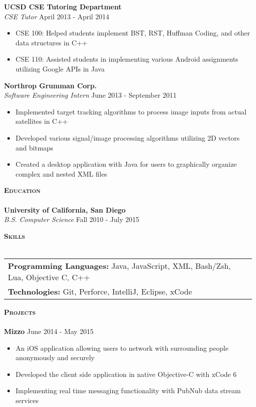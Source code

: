 \documentclass{article}
\newcommand{\lineunder} {
    \vspace*{-8pt} \\
    \hspace*{-18pt} \hrulefill \\
}
\newcommand{\header} [1] {
    {\hspace*{-18pt}\vspace*{6pt} \large{\textbf{\textsc{#1}}}}
    \vspace*{-6pt} \lineunder
}
\begin{document}
\textbf{UCSD CSE Tutoring Department} \hfill \\
\textit{CSE Tutor} \hfill April 2013 - April 2014
\vspace{-1mm}
\begin{itemize} \itemsep -1pt
	\item CSE 100: Helped students implement BST, RST, Huffman Coding, and other data structures in C++
	\item CSE 110: Assisted students in implementing various Android assignments utilizing Google APIs in Java
\end{itemize}

\textbf{Northrop Grumman Corp.} \\
\textit{Software Engineering Intern} \hfill June 2013 - September 2011
\vspace{-1mm}
\begin{itemize} \itemsep -1pt
	\item Implemented target tracking algorithms to process image inputs from actual satellites in C++
	\item Developed various signal/image processing algorithms utilizing 2D vectors and bitmaps
	\item Created a desktop application with Java for users to graphically organize complex and nested XML files
\end{itemize}
\vspace{2mm}

\header{Education}
\textbf{University of California, San Diego}\hfill \\
\textit{B.S. Computer Science} \hfill Fall 2010 - July 2015\\
\vspace{2mm}

\header{Skills}
\begin{tabular}{ l l }
	\textbf{Programming Languages:} Java, JavaScript, XML, Bash/Zsh, Lua, Objective C, C++ \\
	\textbf{Technologies:} Git, Perforce, IntelliJ, Eclipse, xCode \\
\end{tabular}
\vspace{2mm}

\header{Projects}
{\textbf{Mizzo} \hfill June 2014 - May 2015}
\begin{itemize} \itemsep -1pt
	\item An iOS application allowing users to network with surrounding people anonymously and securely
	\item Developed the client side application in native Objective-C  with xCode 6
	\item Implementing real time messaging functionality with PubNub data stream services
\end{itemize}
\end{document}
